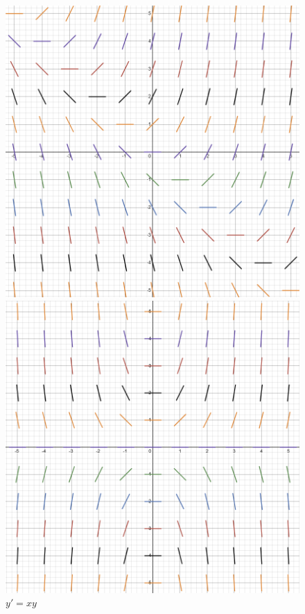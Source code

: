 \documentclass[11pt]{article}
\begin{document}
    \begin{figure}[h]
        \begin{minipage}[c]{0.48\linewidth}
            \includegraphics[width=\linewidth]{F24/Misc. Notes/y'=x+y.png}
            \caption{$y'=x+y$}
            \end{minipage}
            \hfill
            \begin{minipage}[c]{0.48\linewidth}
            \includegraphics[width=\linewidth]{F24/Misc. Notes/y'=xy.png}
            \caption{$y'=xy$}
        \end{minipage}%
    \end{figure}
\end{document}
